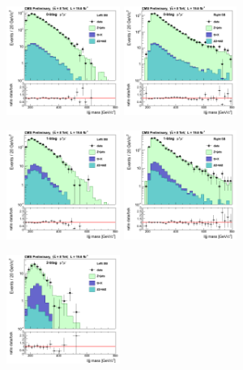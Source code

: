 \begin{figure}[htb]
\centerline{
\includegraphics[width=0.33\textwidth]{plots/approvalxchecks/Left_0b_mm.png}
\includegraphics[width=0.33\textwidth]{plots/approvalxchecks/Right_0b_mm.png}
}
\centerline{
\includegraphics[width=0.33\textwidth]{plots/approvalxchecks/Left_1b_mm.png}
\includegraphics[width=0.33\textwidth]{plots/approvalxchecks/Right_1b_mm.png}
}
\centerline{
\includegraphics[width=0.33\textwidth]{plots/approvalxchecks/Left_2b_mm.png}
}
\end{figure}
